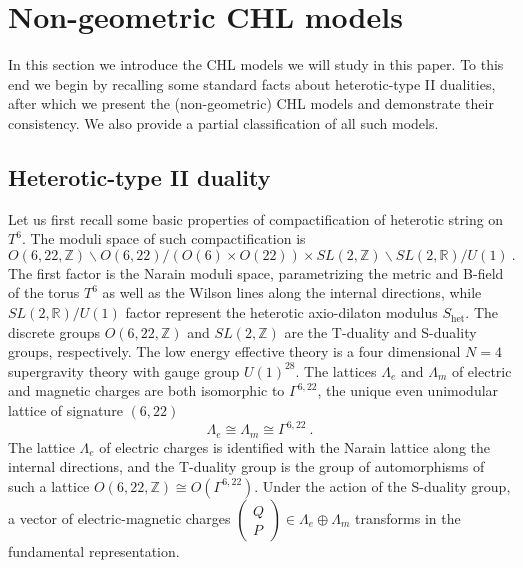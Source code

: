 \documentclass[a4paper,11pt]{article}
\newcommand{\RR}{\mathbb{R}}
\newcommand{\ZZ}{\mathbb{Z}}
\numberwithin{equation}{section}
\def\be{\begin{equation}}
\def\ee{\end{equation}}
\begin{document}
\section{Non-geometric CHL models}
\label{sec:CHL}

In this section we introduce the CHL models we will study in this paper. To this end we begin by recalling some standard facts about heterotic-type II dualities, after which we present the 
(non-geometric) CHL models and demonstrate their consistency. We also provide a partial classification of all such models. 

\subsection{Heterotic-type II duality}
Let us first recall some basic properties of compactification of heterotic string on $T^6$. The moduli space of such compactification is
\be O(6,22,\ZZ)\backslash O(6,22)/(O(6)\times O(22))\times SL(2,\ZZ)\backslash SL(2,\RR)/U(1)\ .
\ee The first factor is the Narain moduli space, parametrizing the metric and B-field of the torus $T^6$ as well as the Wilson lines along the internal directions, while $SL(2,\RR)/U(1)$ factor represent the heterotic axio-dilaton modulus $S_{\text{het}}$. The discrete groups $O(6,22,\ZZ)$ and $SL(2,\ZZ)$ are the T-duality and S-duality groups, respectively. The low energy effective theory is a four dimensional $N=4$ supergravity theory with gauge group $U(1)^{28}$. The lattices $\Lambda_e$ and $\Lambda_m$ of electric and magnetic charges are both isomorphic to $\Gamma^{6,22}$, the unique even unimodular lattice of signature $(6,22)$
\be \Lambda_e\cong\Lambda_m\cong \Gamma^{6,22}\ .
\ee
 The lattice $\Lambda_e$ of electric charges is identified with the Narain lattice along the internal directions, and the T-duality group is the group of automorphisms of such a lattice $O(6,22,\ZZ)\cong O(\Gamma^{6,22})$. Under the action of the S-duality group, a vector of electric-magnetic charges $\left(\begin{smallmatrix}
 Q \\ P
 \end{smallmatrix}\right)
\in \Lambda_e\oplus \Lambda_m$ transforms in the fundamental representation.
\end{document}
